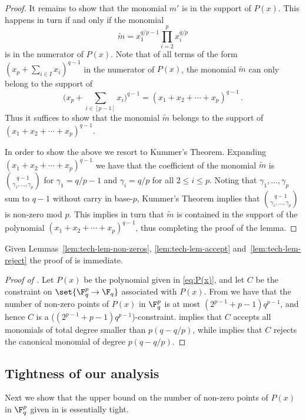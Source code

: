 \begin{proof}
%
%
 It remains to show that
the monomial $m'$ is in the support of $P(x)$. This happens in turn if
and only if the monomial
\[
{\widetilde m} = x_1^{q/p-1} \prod_{i=2}^p x_i^{q/p}
\]
is in the numerator of $P(x)$.
Note that of all terms of the form $(x_p + \sum_{i \in I}x_i)^{q-1}$ in the numerator of $P(x)$, the monomial $\widetilde m$
can only belong to the support of $$\bigg(x_p + \sum_{i \in [p-1]} x_i\bigg)^{q-1} = (x_1 + x_2 + \cdots + x_p)^{q-1}\,.$$ Thus it suffices
to show that the monomial $\widetilde m$ belongs to the support of $(x_1 + x_2 + \cdots + x_p)^{q-1}$.

In order to show the above we resort to Kummer's Theorem. Expanding $(x_1+x_2+ \cdots + x_p)^{q-1}$ we have that the coefficient of the monomial $\widetilde m$ is
$\binom {q-1}  {\gamma_1, \ldots, \gamma_p}$ for $\gamma_1 = q/p -1$ and $\gamma_i = q/p$ for all $2 \leq i \leq p$. Noting that $\gamma_1, \ldots, \gamma_p$ sum to $q-1$ without carry in base-$p$, Kummer's Theorem implies that $\binom {q-1}  {\gamma_1, \ldots, \gamma_p}$ is non-zero mod $p$. This implies in turn that $\widetilde m$ is contained in the support of the polynomial $(x_1+x_2+ \cdots + x_p)^{q-1}$, thus completing the proof of the lemma.
 \end{proof}

 Given Lemmas~\ref{lem:tech-lem-non-zeros}, \ref{lem:tech-lem-accept} and~\ref{lem:tech-lem-reject} the proof of  is immediate.

 \begin{proof}[Proof of ]
Let $P(x)$ be the polynomial given in \eqref{eq:P(x)}, and let $C$ be the constraint on $\set{\F_q^p \to \F_q}$ associated with $P(x)$. {}From 
we have that the number of non-zero points of $P(x)$ in $\F_q^p$ is at most $(2^{p-1} + p-1)q^{p-1}$, and hence $C$ is a
($(2^{p-1}+p-1)q^{p-1}$)-constraint.  implies that $C$ accepts all monomials of total degree smaller
than $p(q-q/p)$, while  implies that $C$ rejects the canonical monomial of degree $p(q-q/p)$.
 \end{proof}

\subsection{Tightness of our analysis}

Next we show that the upper bound on the number of non-zero points of $P(x)$ in $\F_q^p$ given in 
is essentially tight.

